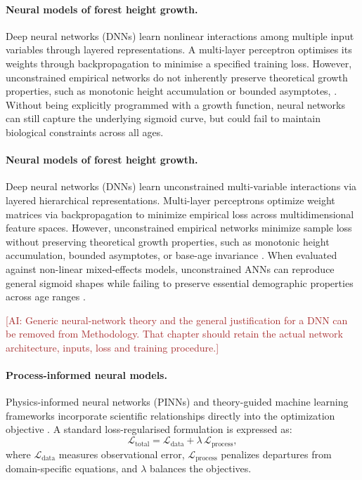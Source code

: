 \documentclass[logo,msc,ai]{infthesis}           %
\newcommand{\ai}[1]{\textcolor{brown}{[AI: #1]}}
\begin{document}
\paragraph*{Neural models of forest height growth.}
Deep neural networks (DNNs) learn nonlinear interactions among multiple input variables through layered representations. A multi-layer perceptron optimises its weights through backpropagation to minimise a specified training loss. However, unconstrained empirical networks do not inherently preserve theoretical growth properties, such as monotonic height accumulation or bounded asymptotes, \cite{karatepe2022Total_C4_NN}. Without being explicitly programmed with a growth function, neural networks can still capture the underlying sigmoid curve, but could fail to maintain biological constraints across all ages. 


\paragraph*{Neural models of forest height growth.}
Deep neural networks (DNNs) learn unconstrained multi-variable interactions via layered hierarchical representations. Multi-layer perceptrons optimize weight matrices via backpropagation to minimize empirical loss across multidimensional feature spaces. However, unconstrained empirical networks minimize sample loss without preserving theoretical growth properties, such as monotonic height accumulation, bounded asymptotes, or base-age invariance \cite{ercanli2023Comparison_C4_NN,karatepe2022Total_C4_NN}. When evaluated against non-linear mixed-effects models, unconstrained ANNs can reproduce general sigmoid shapes while failing to preserve essential demographic properties across age ranges \cite{ercanli2023Comparison_C4_NN}.

\ai{Generic neural-network theory and the general justification for a DNN can be removed from Methodology. That chapter should retain the actual network architecture, inputs, loss and training procedure.}

\paragraph*{Process-informed neural models.}
Physics-informed neural networks (PINNs) and theory-guided machine learning frameworks incorporate scientific relationships directly into the optimization objective \cite{karpatne2017Theory_C4_NN,raissi2019Physics_C4_NN,karniadakis2021Physics_C4_NN,willard2022Integrating_C4_NN}. A standard loss-regularised formulation is expressed as:
\begin{equation}
\mathcal{L}_{\text{total}} = \mathcal{L}_{\text{data}} + \lambda\,\mathcal{L}_{\text{process}},
\label{eq:pinn-loss-general}
\end{equation}
where $\mathcal{L}_{\text{data}}$ measures observational error, $\mathcal{L}_{\text{process}}$ penalizes departures from domain-specific equations, and $\lambda$ balances the objectives. 
\end{document}
